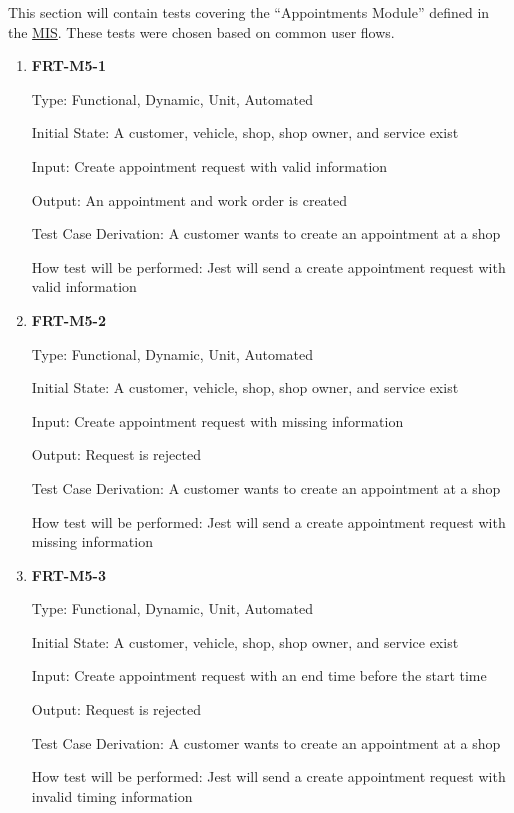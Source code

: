 \documentclass[12pt, titlepage]{article}
\begin{document}
This section will contain tests covering the ``Appointments Module'' defined in the
\href{https://github.com/arkinmodi/project-sayyara/blob/main/docs/Design/MIS/MIS.pdf}{MIS}. These
tests were chosen based on common user flows.

\begin{enumerate}

	\item \textbf{FRT-M5-1}

	      Type: Functional, Dynamic, Unit, Automated

	      Initial State: A customer, vehicle, shop, shop owner, and service exist

	      Input: Create appointment request with valid information

	      Output: An appointment and work order is created

	      Test Case Derivation: A customer wants to create an appointment at a shop

	      How test will be performed: Jest will send a create appointment request with valid information

	\item \textbf{FRT-M5-2}

	      Type: Functional, Dynamic, Unit, Automated

	      Initial State: A customer, vehicle, shop, shop owner, and service exist

	      Input: Create appointment request with missing information

	      Output: Request is rejected

	      Test Case Derivation: A customer wants to create an appointment at a shop

	      How test will be performed: Jest will send a create appointment request with missing information

	\item \textbf{FRT-M5-3}

	      Type: Functional, Dynamic, Unit, Automated

	      Initial State: A customer, vehicle, shop, shop owner, and service exist

	      Input: Create appointment request with an end time before the start time

	      Output: Request is rejected

	      Test Case Derivation: A customer wants to create an appointment at a shop

	      How test will be performed: Jest will send a create appointment request with invalid timing
	      information


\end{enumerate}
\end{document}
